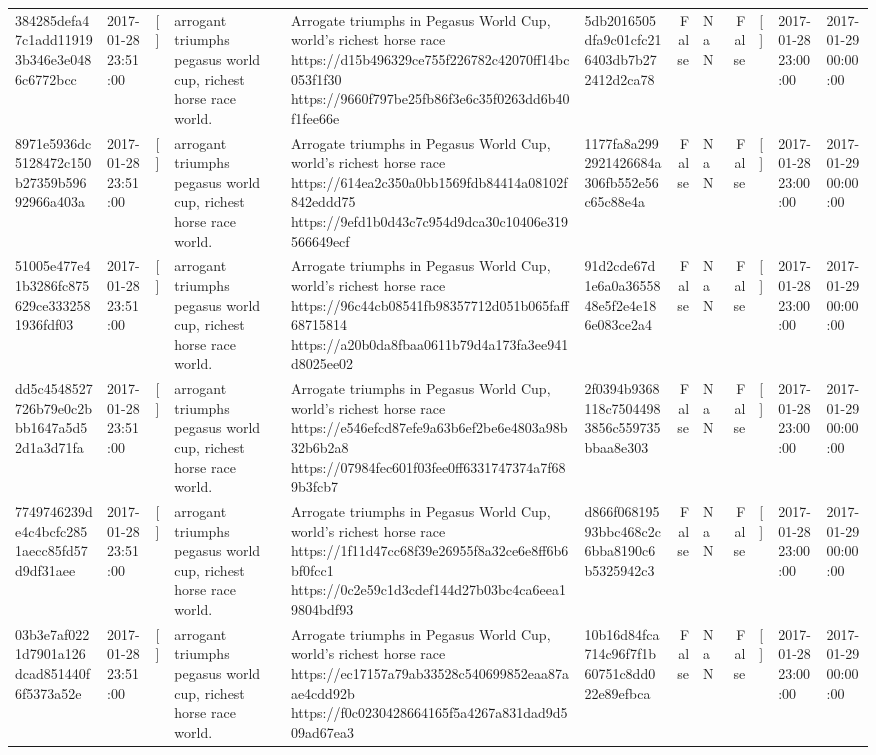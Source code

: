 \begin{tabular}{llllllrlrlll}
384285defa47c1add119193b346e3e0486c6772bcc & 2017-01-28 23:51:00 & [] & arrogant triumphs pegasus world cup, richest horse race world. & Arrogate triumphs in Pegasus World Cup, world's richest horse race https://d15b496329ce755f226782c42070ff14bc053f1f30 https://9660f797be25fb86f3e6c35f0263dd6b40f1fee66e & 5db2016505dfa9c01cfc216403db7b272412d2ca78 & False & NaN & False & [] & 2017-01-28 23:00:00 & 2017-01-29 00:00:00 \\
8971e5936dc5128472c150b27359b59692966a403a & 2017-01-28 23:51:00 & [] & arrogant triumphs pegasus world cup, richest horse race world. & Arrogate triumphs in Pegasus World Cup, world's richest horse race https://614ea2c350a0bb1569fdb84414a08102f842eddd75 https://9efd1b0d43c7c954d9dca30c10406e319566649ecf & 1177fa8a2992921426684a306fb552e56c65c88e4a & False & NaN & False & [] & 2017-01-28 23:00:00 & 2017-01-29 00:00:00 \\
51005e477e41b3286fc875629ce3332581936fdf03 & 2017-01-28 23:51:00 & [] & arrogant triumphs pegasus world cup, richest horse race world. & Arrogate triumphs in Pegasus World Cup, world's richest horse race https://96c44cb08541fb98357712d051b065faff68715814 https://a20b0da8fbaa0611b79d4a173fa3ee941d8025ee02 & 91d2cde67d1e6a0a3655848e5f2e4e186e083ce2a4 & False & NaN & False & [] & 2017-01-28 23:00:00 & 2017-01-29 00:00:00 \\
dd5c4548527726b79e0c2bbb1647a5d52d1a3d71fa & 2017-01-28 23:51:00 & [] & arrogant triumphs pegasus world cup, richest horse race world. & Arrogate triumphs in Pegasus World Cup, world's richest horse race https://e546efcd87efe9a63b6ef2be6e4803a98b32b6b2a8 https://07984fec601f03fee0ff6331747374a7f689b3fcb7 & 2f0394b9368118c75044983856c559735bbaa8e303 & False & NaN & False & [] & 2017-01-28 23:00:00 & 2017-01-29 00:00:00 \\
7749746239de4c4bcfc2851aecc85fd57d9df31aee & 2017-01-28 23:51:00 & [] & arrogant triumphs pegasus world cup, richest horse race world. & Arrogate triumphs in Pegasus World Cup, world's richest horse race https://1f11d47cc68f39e26955f8a32ce6e8ff6b6bf0fcc1 https://0c2e59c1d3cdef144d27b03bc4ca6eea19804bdf93 & d866f06819593bbc468c2c6bba8190c6b5325942c3 & False & NaN & False & [] & 2017-01-28 23:00:00 & 2017-01-29 00:00:00 \\
03b3e7af0221d7901a126dcad851440f6f5373a52e & 2017-01-28 23:51:00 & [] & arrogant triumphs pegasus world cup, richest horse race world. & Arrogate triumphs in Pegasus World Cup, world's richest horse race https://ec17157a79ab33528c540699852eaa87aae4cdd92b https://f0c0230428664165f5a4267a831dad9d509ad67ea3 & 10b16d84fca714c96f7f1b60751c8dd022e89efbca & False & NaN & False & [] & 2017-01-28 23:00:00 & 2017-01-29 00:00:00 \\

\end{tabular}
